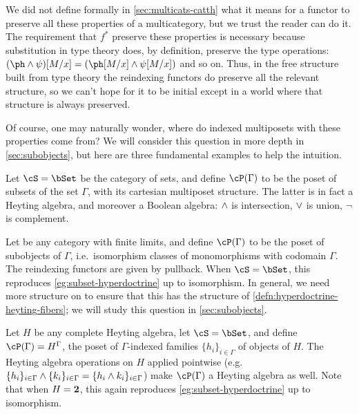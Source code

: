 We did not define formally in \cref{sec:multicats-catth} what it means for a functor to preserve all these properties of a multicategory, but we trust the reader can do it.
The requirement that $f^*$ preserve these properties is necessary because substitution in type theory does, by definition, preserve the type operations: $(\ph\meet\psi)[M/x] = (\ph[M/x] \meet \psi[M/x])$ and so on.
Thus, in the free structure built from type theory the reindexing functors do preserve all the relevant structure, so we can't hope for it to be initial except in a world where that structure is always preserved.

Of course, one may naturally wonder, where do indexed multiposets with these properties come from?
We will consider this question in more depth in \cref{sec:subobjects}, but here are three fundamental examples to help the intuition.

\begin{eg}\label{eg:subset-hyperdoctrine}
  Let $\cS=\bSet$ be the category of sets, and define $\cP(\Gamma)$ to be the poset of subsets of the set $\Gamma$, with its cartesian multiposet structure.
  The latter is in fact a Heyting algebra, and moreover a Boolean algebra: $\wedge$ is intersection, $\vee$ is union, $\neg$ is complement.
\end{eg}

\begin{eg}\label{eg:subobject-hyperdoctrine}
  Let \cS be any category with finite limits, and define $\cP(\Gamma)$ to be the poset of subobjects of $\Gamma$, i.e.\ isomorphism classes of monomorphisms with codomain $\Gamma$.
  The reindexing functors are given by pullback.
  When $\cS=\bSet$, this reproduces \cref{eg:subset-hyperdoctrine} up to isomorphism.
  In general, we need more structure on \cS to ensure that this \cP has the structure of \cref{defn:hyperdoctrine-heyting-fibers}; we will study this question in \cref{sec:subobjects}.
\end{eg}

\begin{eg}\label{eg:family-hyperdoctrine}
  Let $H$ be any complete Heyting algebra, let $\cS=\bSet$, and define $\cP(\Gamma) = H^\Gamma$, the poset of $\Gamma$-indexed families $\{h_i\}_{i\in\Gamma}$ of objects of $H$.
  The Heyting algebra operations on $H$ applied pointwise (e.g. $\{h_i\}_{i\in\Gamma} \wedge \{k_i\}_{i\in\Gamma}= \{h_i\wedge k_i\}_{i\in\Gamma}$) make $\cP(\Gamma)$ a Heyting algebra as well.
  Note that when $H=\mathbf{2}$, this again reproduces \cref{eg:subset-hyperdoctrine} up to isomorphism.
\end{eg}

